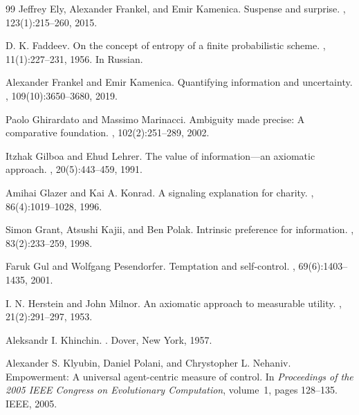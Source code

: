 \documentclass[11pt,a4paper]{article}
\theoremstyle{definition}
\newcommand{\1}{\mathbf 1}
\begin{document}
\begin{thebibliography}{99}
Jeffrey Ely, Alexander Frankel, and Emir Kamenica.
\newblock Suspense and surprise.
, 123(1):215--260, 2015.

D. K. Faddeev.
\newblock On the concept of entropy of a finite probabilistic scheme.
, 11(1):227--231, 1956.
\newblock In Russian.

Alexander Frankel and Emir Kamenica.
\newblock Quantifying information and uncertainty.
, 109(10):3650--3680, 2019.

Paolo Ghirardato and Massimo Marinacci.
\newblock Ambiguity made precise: A comparative foundation.
, 102(2):251--289, 2002.

Itzhak Gilboa and Ehud Lehrer.
\newblock The value of information---an axiomatic approach.
, 20(5):443--459, 1991.

Amihai Glazer and Kai A. Konrad.
\newblock A signaling explanation for charity.
, 86(4):1019--1028, 1996.

Simon Grant, Atsushi Kajii, and Ben Polak.
\newblock Intrinsic preference for information.
, 83(2):233--259, 1998.

Faruk Gul and Wolfgang Pesendorfer.
\newblock Temptation and self-control.
, 69(6):1403--1435, 2001.

I. N. Herstein and John Milnor.
\newblock An axiomatic approach to measurable utility.
, 21(2):291--297, 1953.


Aleksandr I. Khinchin.
.
\newblock Dover, New York, 1957.

Alexander S. Klyubin, Daniel Polani, and Chrystopher L. Nehaniv.
\newblock Empowerment: A universal agent-centric measure of control.
\newblock In {\em Proceedings of the 2005 IEEE Congress on Evolutionary Computation}, volume~1, pages 128--135. IEEE,
  2005.


\end{thebibliography}
\end{document}
